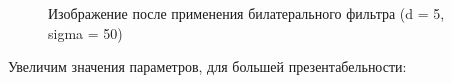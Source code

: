 \documentclass[14pt,a4paper,report]{report}
\begin{document}
\begin{figure}[h]
\begin{minipage}[h]{0.47\linewidth}
\end{minipage}
\caption{Изображение после применения билатерального фильтра (d = 5, sigma = 50)}
\label{ris:image1}
\end{figure}

\clearpage
Увеличим значения параметров, для большей презентабельности:
\end{document}
